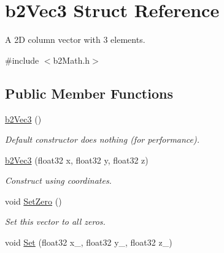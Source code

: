 \hypertarget{structb2_vec3}{}\section{b2\+Vec3 Struct Reference}
\label{structb2_vec3}


A 2D column vector with 3 elements.  




{\ttfamily \#include $<$b2\+Math.\+h$>$}

\subsection*{Public Member Functions}
\begin{DoxyCompactItemize}
\item 
\hyperlink{structb2_vec3_a837423f66d6fb72d815e7390c09938b9}{b2\+Vec3} ()\hypertarget{structb2_vec3_a837423f66d6fb72d815e7390c09938b9}{}\label{structb2_vec3_a837423f66d6fb72d815e7390c09938b9}

\begin{DoxyCompactList}\small\item\em Default constructor does nothing (for performance). \end{DoxyCompactList}\item 
\hyperlink{structb2_vec3_a47df55b26ab254dcf42a16638c7feeeb}{b2\+Vec3} (float32 x, float32 y, float32 z)\hypertarget{structb2_vec3_a47df55b26ab254dcf42a16638c7feeeb}{}\label{structb2_vec3_a47df55b26ab254dcf42a16638c7feeeb}

\begin{DoxyCompactList}\small\item\em Construct using coordinates. \end{DoxyCompactList}\item 
void \hyperlink{structb2_vec3_a5a459ed49f1910a347ca247f848a2dd8}{Set\+Zero} ()\hypertarget{structb2_vec3_a5a459ed49f1910a347ca247f848a2dd8}{}\label{structb2_vec3_a5a459ed49f1910a347ca247f848a2dd8}

\begin{DoxyCompactList}\small\item\em Set this vector to all zeros. \end{DoxyCompactList}\item 
void \hyperlink{structb2_vec3_a12a1bc14bbe722dfb175a492d2d00a79}{Set} (float32 x\+\_\+, float32 y\+\_\+, float32 z\+\_\+)\hypertarget{structb2_vec3_a12a1bc14bbe722dfb175a492d2d00a79}{}\label{structb2_vec3_a12a1bc14bbe722dfb175a492d2d00a79}


\end{DoxyCompactItemize}
